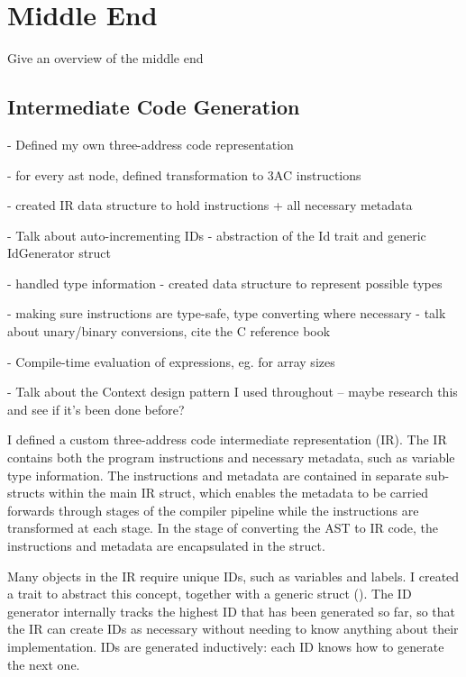 \documentclass[00-main.tex]{subfiles}
\begin{document}
\section{Middle End}

\begin{mrwComment}
Give an overview of the middle end
\end{mrwComment}

\subsection{Intermediate Code Generation}

\begin{mrwComment}
- Defined my own three-address code representation

- for every ast node, defined transformation to 3AC instructions

- created IR data structure to hold instructions + all necessary metadata

- Talk about auto-incrementing IDs - abstraction of the Id trait and generic IdGenerator struct

- handled type information - created data structure to represent possible types

- making sure instructions are type-safe, type converting where necessary - talk about unary/binary conversions, cite the C reference book

- Compile-time evaluation of expressions, eg. for array sizes

- Talk about the Context design pattern I used throughout -- maybe research this and see if it's been done before?
\end{mrwComment}

I defined a custom three-address code intermediate representation (IR).
The IR contains both the program instructions and necessary metadata, such as variable type information.
The instructions and metadata are contained in separate sub-structs within the main IR struct, which enables the metadata to be carried forwards through stages of the compiler pipeline while the instructions are transformed at each stage.
In the stage of converting the AST to IR code, the instructions and metadata are encapsulated in the  struct.

Many objects in the IR require unique IDs, such as variables and labels.
I created a  trait to abstract this concept, together with a generic  struct ().
The ID generator internally tracks the highest ID that has been generated so far, so that the IR can create IDs as necessary without needing to know anything about their implementation.
IDs are generated inductively: each ID knows how to generate the next one.
\end{document}
